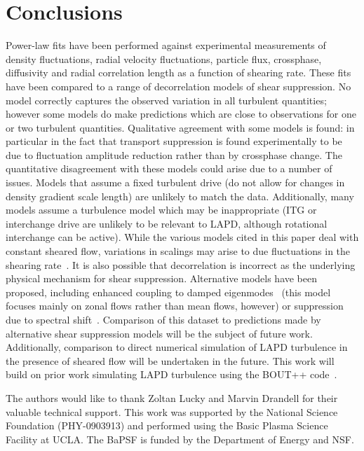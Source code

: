 \documentclass[aip,pop,amsmath,amssymb,peprint,superscriptaddress]{revtex4-1} %
\begin{document}
\section{Conclusions}

Power-law fits have been performed against experimental measurements
of density fluctuations, radial velocity fluctuations, particle flux,
crossphase, diffusivity and radial correlation length as a function of
shearing rate.  These fits have been compared to a range of
decorrelation models of shear suppression. No model correctly captures
the observed variation in all turbulent quantities; however some
models do make predictions which are close to observations for one or
two turbulent quantities.  Qualitative agreement with some models is
found: in particular in the fact that transport suppression is found
experimentally to be due to fluctuation amplitude reduction rather
than by crossphase change.  The quantitative disagreement with
these models could arise due to a number of issues.  Models that
assume a fixed turbulent drive (do not allow for changes in density
gradient scale length) are unlikely to match the data.  Additionally,
many models assume a turbulence model which may be inappropriate (ITG
or interchange drive are unlikely to be relevant to LAPD, although
rotational interchange can be active). While the various models cited in this paper deal with constant sheared flow, variations in scalings may arise to due fluctuations in the shearing rate~\cite{kim04,leconte06,newton07}.  It is also possible
that decorrelation is incorrect as the underlying physical mechanism
for shear suppression.  Alternative models have been proposed,
including enhanced coupling to damped eigenmodes~\cite{terry06} (this model focuses
mainly on zonal flows rather than mean flows, however) or suppression
due to spectral shift~\cite{staebler12}.  Comparison of this dataset to
predictions made by alternative shear suppression models will be the
subject of future work.  Additionally, comparison to direct numerical
simulation of LAPD turbulence in the presence of sheared flow will
be undertaken in the future.  This work will build on prior work simulating LAPD turbulence
using the BOUT++ code~\cite{friedman12,umansky11,popovich10BOUT}.

The authors would like to thank Zoltan Lucky and Marvin Drandell for their valuable technical support.  This work
was supported by the National Science Foundation (PHY-0903913) and performed using the Basic Plasma Science Facility at UCLA. The BaPSF is funded by the
Department of Energy and NSF.
\end{document}
